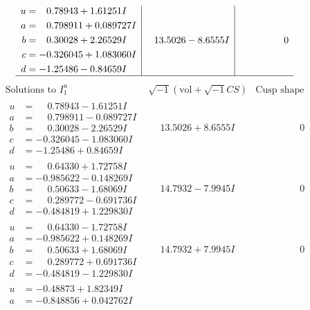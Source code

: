 \documentclass[1p]{elsarticle_modified}
\theoremstyle{definition}
\newcommand{\I}{\sqrt{-1}}
\begin{document}
$$\begin{array}{c|c|c}
\begin{aligned}
u &= \phantom{-}0.78943 + 1.61251 I \\
a &= \phantom{-}0.798911 + 0.089727 I \\
b &= \phantom{-}0.30028 + 2.26529 I \\
c &= -0.326045 + 1.083060 I \\
d &= -1.25486 - 0.84659 I\end{aligned}
 & \phantom{-}13.5026 - 8.6555 I & \phantom{-0.000000 } 0\\
 \hline 
 \end{array}$$\newpage$$\begin{array}{c|c|c}  
\text{Solutions to }I^u_{1}& \I (\text{vol} + \sqrt{-1}CS) & \text{Cusp shape}\\
 \hline 
\begin{aligned}
u &= \phantom{-}0.78943 - 1.61251 I \\
a &= \phantom{-}0.798911 - 0.089727 I \\
b &= \phantom{-}0.30028 - 2.26529 I \\
c &= -0.326045 - 1.083060 I \\
d &= -1.25486 + 0.84659 I\end{aligned}
 & \phantom{-}13.5026 + 8.6555 I & \phantom{-0.000000 } 0 \\ \hline\begin{aligned}
u &= \phantom{-}0.64330 + 1.72758 I \\
a &= -0.985622 - 0.148269 I \\
b &= \phantom{-}0.50633 - 1.68069 I \\
c &= \phantom{-}0.289772 - 0.691736 I \\
d &= -0.484819 + 1.229830 I\end{aligned}
 & \phantom{-}14.7932 - 7.9945 I & \phantom{-0.000000 } 0 \\ \hline\begin{aligned}
u &= \phantom{-}0.64330 - 1.72758 I \\
a &= -0.985622 + 0.148269 I \\
b &= \phantom{-}0.50633 + 1.68069 I \\
c &= \phantom{-}0.289772 + 0.691736 I \\
d &= -0.484819 - 1.229830 I\end{aligned}
 & \phantom{-}14.7932 + 7.9945 I & \phantom{-0.000000 } 0 \\ \hline\begin{aligned}
u &= -0.48873 + 1.82349 I \\
a &= -0.848856 + 0.042762 I \\

\end{aligned}
\end{array}$$
\end{document}
